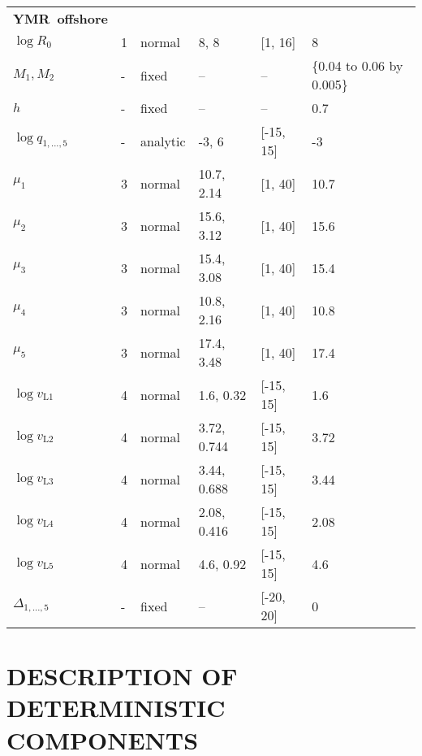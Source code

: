 \documentclass[11pt]{book}
\begin{document}
\begin{longtable}{L{1in}C{1.0in}C{1.0in}C{1.0in}C{1.0in}C{1.4in}}
\textbf{YMR~offshore} &   &          &              &             &\\
$\log R_0$                    & 1 & normal   & 8, 8         & [1, 16]     &  8\\
$M_{1}, M_{2}$                & - & fixed    & --           & --          &  {\footnotesize\{0.04 to 0.06 by 0.005\}}\\
$h$                           & - & fixed    & --           & --          &  0.7\\
$\log q_{1,...,5}$            & - & analytic & -3,   6      & [-15, 15]   & -3\\
$\mu_{1}$                     & 3 & normal  & 10.7,  2.14   & [1, 40]     & 10.7\\
$\mu_{2}$                     & 3 & normal  & 15.6,  3.12   & [1, 40]     & 15.6\\
$\mu_{3}$                     & 3 & normal  & 15.4,  3.08   & [1, 40]     & 15.4\\
$\mu_{4}$                     & 3 & normal  & 10.8,  2.16   & [1, 40]     & 10.8\\
$\mu_{5}$                     & 3 & normal  & 17.4,  3.48   & [1, 40]     & 17.4\\
$\log v_{\mathrm{L}1}$        & 4 & normal  &  1.6,  0.32   & [-15, 15]   &  1.6\\
$\log v_{\mathrm{L}2}$        & 4 & normal  &  3.72, 0.744  & [-15, 15]   &  3.72\\
$\log v_{\mathrm{L}3}$        & 4 & normal  &  3.44, 0.688  & [-15, 15]   &  3.44\\
$\log v_{\mathrm{L}4}$        & 4 & normal  &  2.08, 0.416  & [-15, 15]   &  2.08\\
$\log v_{\mathrm{L}5}$        & 4 & normal  &  4.6,  0.92   & [-15, 15]   &  4.6\\
$\Delta_{1,...,5}$            & - & fixed   &  --           & [-20, 20]   &  0\\
\hline  
\end{longtable}


\section{DESCRIPTION OF DETERMINISTIC COMPONENTS}
\end{document}
